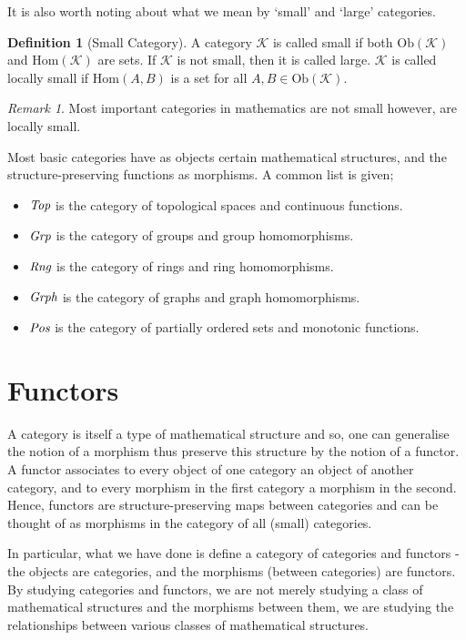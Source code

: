 \documentclass[10pt, oneside, reqno]{amsart}
\theoremstyle{plain}%
\theoremstyle{definition}
\newtheorem{defn}[thm]{Definition}
\theoremstyle{remark}
\newtheorem*{rem}{Remark}
\newcommand{\Cat}{\mathcal{K}}
\begin{document}
It is also worth noting about what we mean by `small' and `large' categories.

\begin{defn}[Small Category]
	A category $\Cat$ is called small if both $\text{Ob}(\Cat)$ and $\text{Hom}(\Cat)$ are sets.
	If $\Cat$ is not small, then it is called large.
	$\Cat$ is called locally small if $\text{Hom}(A,B)$ is a set for all $A, B \in \text{Ob}(\Cat)$.
\end{defn}

\begin{rem}
	Most important categories in mathematics are not small however, are locally small.
\end{rem}

Most basic categories have as objects certain mathematical structures, and the structure-preserving
functions as morphisms. A common list is given;
\begin{itemize}
\item $\emph{Top}$ is the category of topological spaces and continuous functions.
\item $\emph{Grp}$ is the category of groups and group homomorphisms.
\item $\emph{Rng}$ is the category of rings and ring homomorphisms.
\item $\emph{Grph}$ is the category of graphs and graph homomorphisms.
\item $\emph{Pos}$ is the category of partially ordered sets and monotonic functions.
\end{itemize}


\section{Functors} %
\label{sec:functors}
A category is itself a type of mathematical structure and so, one can generalise the notion of a morphism thus preserve this structure by the notion of a
functor.
A functor associates to every object of one category an object of another category, and to every morphism in the first category a morphism in the second.
Hence, functors are structure-preserving maps between categories and can be thought of as morphisms in the category of all (small) categories.

In particular, what we have done is define a category of categories and functors - the objects are categories, and the morphisms (between categories) 
are functors.
By studying categories and functors, we are not merely studying a class of mathematical structures and the morphisms between them,
we are studying the relationships between various classes of mathematical structures.
\end{document}
